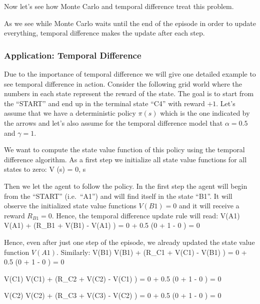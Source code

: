 Now let's see how Monte Carlo and temporal difference treat this problem.


As we see while Monte Carlo waits until the end of the episode in order to update everything, temporal difference
makes the update after each step.
\ee

\subsubsection*{Application: Temporal Difference}

Due to the importance of temporal difference we will give one detailed example to see temporal difference in action.
Consider the following grid world where the numbers in each state represent the reward of the state. The goal is to
start from the ``START'' and end up in the terminal state ``C4'' with reward $+1$. Let's assume that we have a
deterministic policy $\pi(s)$ which is the one indicated by the arrows and let's also assume for the temporal
difference model that $\alpha = 0.5$ and $\gamma = 1$.


We want to compute the state value function of this policy using the temporal difference algorithm. As a first step
we initialize all state value functions for all states to zero:
\bse
V (s) = 0, \forall s
\ese

Then we let the agent to follow the policy. In the first step the agent will begin from the ``START'' (i.e.\ ``A1'') and
will find itself in the state ``B1''. It will observe the initialized state value functions $V(B1) = 0$ and it will
receive a reward $R_{B1} = 0$. Hence, the temporal difference update rule will read:
\bse
V(A1) \gets V(A1) + \alpha \left(R_{B1} + \gamma V(B1) - V(A1) \right) =
0 + 0.5 \cdot \left(0 + 1  - 0 \right) = 0
\ese

Hence, even after just one step of the episode, we already updated the state value function $V(A1)$. Similarly:
\bse
V(B1) \gets V(B1) + \alpha \left(R_{C1} + \gamma V(C1) - V(B1) \right) =
0 + 0.5 \cdot \left(0 + 1  - 0 \right) = 0
\ese

\bse
V(C1) \gets V(C1) + \alpha \left(R_{C2} + \gamma V(C2) - V(C1) \right) =
0 + 0.5 \cdot \left(0 + 1  - 0 \right) = 0
\ese

\bse
V(C2) \gets V(C2) + \alpha \left(R_{C3} + \gamma V(C3) - V(C2) \right) =
0 + 0.5 \cdot \left(0 + 1  - 0 \right) = 0
\ese

